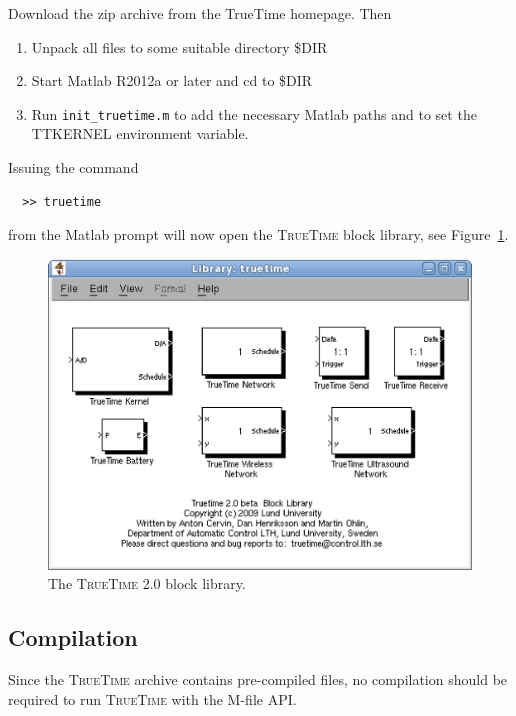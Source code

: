 \documentclass[final,twoside]{rapport}
\begin{document}
Download the zip archive from the TrueTime homepage. Then
\begin{enumerate}
\item Unpack all files to some suitable directory \$DIR
\item Start Matlab R2012a or later and cd to \$DIR
\item Run \verb!init_truetime.m! to add the necessary Matlab paths and to
   set the TTKERNEL environment variable.
\end{enumerate}

Issuing the command
\begin{small}
\begin{verbatim}
  >> truetime
\end{verbatim}
\end{small}
from the Matlab prompt will now open the \textsc{TrueTime} block
library, see Figure~\ref{fig:library}.

\begin{figure}[tbp]
  \begin{center}
    \includegraphics[scale=.5]{lib2.0beta.eps}
  \end{center}
  \caption{The \textsc{TrueTime} 2.0 block library.}
  \label{fig:library}
\end{figure}

\subsection{Compilation}
\label{sec:start_compile}
Since the \textsc{TrueTime} archive contains pre-compiled files, no
compilation should be required to run \textsc{TrueTime} with the M-file API.
\end{document}

